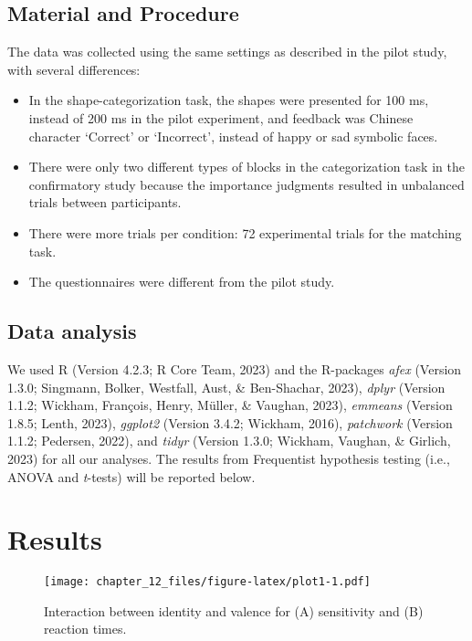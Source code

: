 \documentclass[
  man]{apa6}
\providecommand{\tightlist}{%
  \setlength{\itemsep}{0pt}\setlength{\parskip}{0pt}}
\begin{document}
\hypertarget{material-and-procedure}{%
\subsection{Material and Procedure}\label{material-and-procedure}}

The data was collected using the same settings as described in the pilot study, with several differences:

\begin{itemize}
\tightlist
\item
  In the shape-categorization task, the shapes were presented for 100 ms, instead of 200 ms in the pilot experiment, and feedback was Chinese character `Correct' or `Incorrect', instead of happy or sad symbolic faces.
\item
  There were only two different types of blocks in the categorization task in the confirmatory study because the importance judgments resulted in unbalanced trials between participants.
\item
  There were more trials per condition: 72 experimental trials for the matching task.
\item
  The questionnaires were different from the pilot study.
\end{itemize}

\hypertarget{data-analysis}{%
\subsection{Data analysis}\label{data-analysis}}

We used R (Version 4.2.3; R Core Team, 2023) and the R-packages \emph{afex} (Version 1.3.0; Singmann, Bolker, Westfall, Aust, \& Ben-Shachar, 2023), \emph{dplyr} (Version 1.1.2; Wickham, François, Henry, Müller, \& Vaughan, 2023), \emph{emmeans} (Version 1.8.5; Lenth, 2023), \emph{ggplot2} (Version 3.4.2; Wickham, 2016), \emph{patchwork} (Version 1.1.2; Pedersen, 2022), and \emph{tidyr} (Version 1.3.0; Wickham, Vaughan, \& Girlich, 2023) for all our analyses. The results from Frequentist hypothesis testing (i.e., ANOVA and \emph{t}-tests) will be reported below.

\hypertarget{results}{%
\section{Results}\label{results}}

\begin{figure}
\centering
\texttt{[image: chapter\_12\_files/figure-latex/plot1-1.pdf]}
\caption{\label{fig:plot1}Interaction between identity and valence for (A) sensitivity and (B) reaction times.}
\end{figure}
\end{document}
